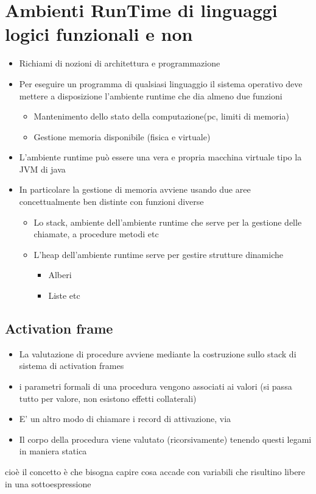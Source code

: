 \documentclass[12pt, a4paper, openany, oneside]{book}
\begin{document}
{\section{Ambienti RunTime di linguaggi logici funzionali e non}
\begin{itemize}
	\item Richiami di nozioni di architettura e programmazione
	\item Per eseguire un programma di qualsiasi linguaggio il sistema operativo
	deve mettere a disposizione l'ambiente runtime che dia almeno due funzioni
	\begin{itemize}
		\item Mantenimento dello stato della computazione(pc, limiti di memoria)
		\item Gestione memoria disponibile (fisica e virtuale)
	\end{itemize}
	\item L'ambiente runtime può essere una vera e propria macchina virtuale tipo la JVM di java
	\item In particolare la gestione di memoria avviene usando due aree 
	concettualmente ben distinte con funzioni diverse
	\begin{itemize}
		\item Lo stack, ambiente dell'ambiente runtime che serve per la gestione 
		delle chiamate, a procedure metodi etc
		\item L'heap dell'ambiente runtime serve per gestire strutture dinamiche
		\begin{itemize}
			\item Alberi
			\item Liste etc
		\end{itemize}
	\end{itemize}
\end{itemize}
\subsection{Activation frame}
\begin{itemize}
	\item La valutazione di procedure avviene mediante la costruzione sullo
	stack di sistema di activation frames
	\item i parametri formali di una procedura vengono associati ai valori
	(si passa tutto per valore, non esistono effetti collaterali)
	\item E' un altro modo di chiamare i record di attivazione, via
	\item Il corpo della procedura viene valutato (ricorsivamente) tenendo 
	questi legami in maniera statica
\end{itemize}
cioè il concetto è che bisogna capire cosa accade con variabili che risultino 
libere in una sottoespressione
}
\end{document}
